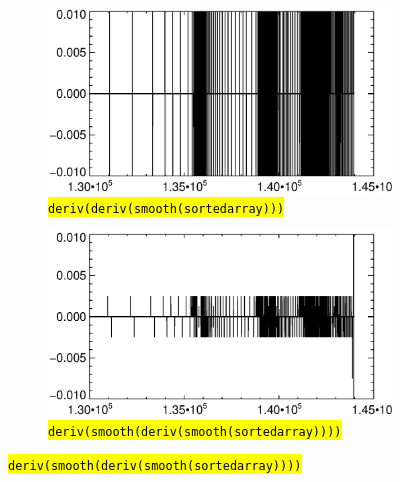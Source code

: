 \documentclass[10pt]{scrartcl}
\begin{document}
\begin{figure}[!h]
\begin{center}
    \begin{subfigure}[b]{.49\textwidth}
        \centering
        \includegraphics[width=1.\textwidth]{../plots_tables_images/sm_firstsmoothonly.eps}
        \caption{\hl{\texttt{deriv(deriv(smooth(sortedarray)))}}}
    \end{subfigure}
    \begin{subfigure}[b]{.49\textwidth}
        \centering
        \includegraphics[width=1.\textwidth]{../plots_tables_images/sm_nowrap.eps}
        \caption{\hl{\texttt{deriv(smooth(deriv(smooth(sortedarray))))}}}
    \end{subfigure}


\end{center}
\end{figure}
\end{document}
